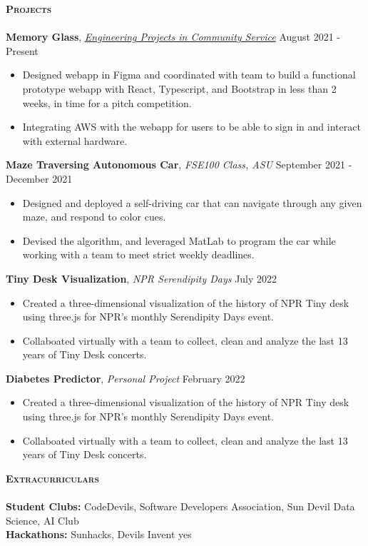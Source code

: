 \documentclass[a4paper]{article}
\newcommand{\lineunder} {
    \vspace*{-8pt} \\
    \hspace*{-18pt} \hrulefill \\
}
\newcommand{\header} [1] {
    {\hspace*{-15pt}\vspace*{3pt} \textsc{#1}}
    \vspace*{-6pt} \lineunder
}
\begin{document}
\vspace{-2mm}
\header{\textbf{Projects}}
\textbf{Memory Glass},  \href{https://epics.engineering.asu.edu/}{\textit{Engineering Projects in Community Service}} \faExternalLink
\hfill August 2021 - Present\\
\vspace{-3mm}
\begin{itemize}
    \itemsep-0.05em
    \item Designed webapp in Figma and coordinated with team to build a functional prototype webapp with React, Typescript, and Bootstrap in less than 2 weeks, in time for a pitch competition. 
    \item Integrating AWS with the webapp for users to be able to sign in and interact with external hardware.
    
\end{itemize}

\textbf{Maze Traversing Autonomous Car}, \textit{FSE100 Class, ASU}
\hfill September 2021 - December 2021\\
\vspace{-3mm}
\begin{itemize}
    \itemsep-0.05em
    \item Designed and deployed a self-driving car that can navigate through any given maze, and respond to color cues. 
    \item Devised the algorithm, and leveraged MatLab to program the car while working with a team to meet strict weekly deadlines. 
\end{itemize}

\textbf{Tiny Desk Visualization}, \textit{NPR Serendipity Days}
\hfill July 2022\\
\vspace{-3mm}
\begin{itemize}
    \itemsep-0.05em
    \item Created a three-dimensional visualization of the history of NPR Tiny desk using three.js for NPR's monthly Serendipity Days event. 
    \item Collaboated virtually with a team to collect, clean and analyze the last 13 years of Tiny Desk concerts. 
\end{itemize}


\textbf{Diabetes Predictor}, \textit{Personal Project}
\hfill February 2022\\
\vspace{-3mm}
\begin{itemize}
    \itemsep-0.05em
    \item Created a three-dimensional visualization of the history of NPR Tiny desk using three.js for NPR's monthly Serendipity Days event. 
    \item Collaboated virtually with a team to collect, clean and analyze the last 13 years of Tiny Desk concerts. 
\end{itemize}

\header{\textbf{Extracurriculars}}


\textbf{Student Clubs:} CodeDevils, Software Developers Association, Sun Devil Data Science, AI Club \\
\textbf{Hackathons:} Sunhacks, Devils Invent yes



\vspace{-50mm}
    
\end{document}
